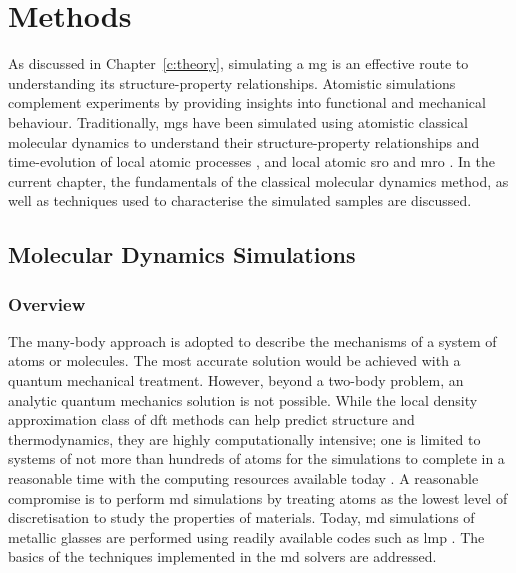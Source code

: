 \chapter{Methods} \label{c:methods}
As discussed in Chapter~\ref{c:theory}, simulating a \gls{mg} is an effective route to understanding its structure-property relationships. Atomistic simulations complement experiments by providing insights into functional and mechanical behaviour. Traditionally, \gls{mg}s have been simulated using atomistic classical molecular dynamics to understand their structure-property relationships and time-evolution of local atomic processes \cite{Schuh2007,Cheng2008}, and local atomic \gls{sro} and \gls{mro} \cite{Sheng2006}. In the current chapter, the fundamentals of the classical molecular dynamics method, as well as techniques used to characterise the simulated samples are discussed. \par

\section{Molecular Dynamics Simulations} \label{s:md}
\subsection{Overview}
The many-body approach is adopted to describe the mechanisms of a system of atoms or molecules. The most accurate solution would be achieved with a quantum mechanical treatment. However, beyond a two-body problem, an analytic quantum mechanics solution is not possible. While the local density approximation class of \gls{dft} methods can help predict structure and thermodynamics, they are highly computationally intensive; one is limited to systems of not more than hundreds of atoms for the simulations to complete in a reasonable time with the computing resources available today \cite{Burke2012}. A reasonable compromise is to perform \gls{md} simulations by treating atoms as the lowest level of discretisation to study the properties of materials. Today, \gls{md} simulations of metallic glasses are performed using readily available codes such as \gls{lmp} \cite{Plimpton1995,Thompson2022}. The basics of the techniques implemented in the \gls{md} solvers are addressed.  \par

